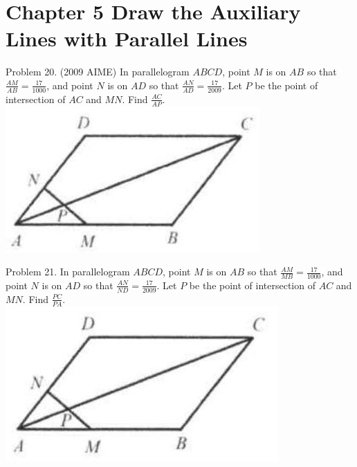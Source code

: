\documentclass[10pt]{article}
\begin{document}
\section*{Chapter 5 Draw the Auxiliary Lines with Parallel Lines}
Problem 20. (2009 AIME) In parallelogram \(A B C D\), point \(M\) is on \(A B\) so that \(\frac{A M}{A B}=\frac{17}{1000}\), and point \(N\) is on \(A D\) so that \(\frac{A N}{A D}=\frac{17}{2009}\). Let \(P\) be the point of intersection of \(A C\) and \(M N\). Find \(\frac{A C}{A P}\).\\
\includegraphics[max width=\textwidth, center]{2025_04_17_97bc1f7e44d93c271a88g-130(2)}

Problem 21. In parallelogram \(A B C D\), point \(M\) is on \(A B\) so that \(\frac{A M}{M B}=\frac{17}{1000}\), and point \(N\) is on \(A D\) so that \(\frac{A N}{N D}=\frac{17}{2009}\). Let \(P\) be the point of intersection of \(A C\) and \(M N\). Find \(\frac{P C}{P A}\).\\
\includegraphics[max width=\textwidth, center]{2025_04_17_97bc1f7e44d93c271a88g-130(1)}
\end{document}

